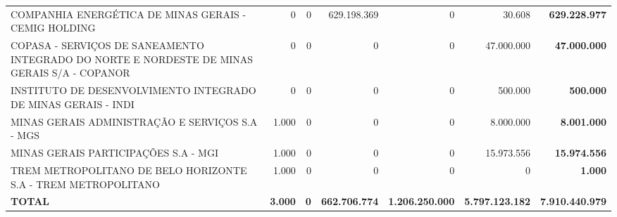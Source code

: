 \documentclass{article}
\begin{document}
\begin{longtable}[c]{m{5cm}|m{2cm}|m{2cm}|m{2cm}|m{2cm}|m{2cm}|m{2cm}}
\multicolumn{1}{L{5cm}|}{COMPANHIA ENERGÉTICA DE MINAS GERAIS - CEMIG HOLDING} & \multicolumn{1}{r|}{    0} & \multicolumn{1}{r|}{0} & \multicolumn{1}{r|}{629.198.369} & \multicolumn{1}{r|}{            0} & \multicolumn{1}{r|}{30.608} & \multicolumn{1}{r}{ \textbf{629.228.977}} \\
\multicolumn{1}{L{5cm}|}{COPASA - SERVIÇOS DE SANEAMENTO INTEGRADO DO NORTE E NORDESTE DE MINAS GERAIS S/A - COPANOR} & \multicolumn{1}{r|}{    0} & \multicolumn{1}{r|}{0} & \multicolumn{1}{r|}{          0} & \multicolumn{1}{r|}{            0} & \multicolumn{1}{r|}{47.000.000} & \multicolumn{1}{r}{ \textbf{47.000.000}} \\
\multicolumn{1}{L{5cm}|}{INSTITUTO DE DESENVOLVIMENTO INTEGRADO DE MINAS GERAIS - INDI} & \multicolumn{1}{r|}{    0} & \multicolumn{1}{r|}{0} & \multicolumn{1}{r|}{          0} & \multicolumn{1}{r|}{            0} & \multicolumn{1}{r|}{500.000} & \multicolumn{1}{r}{ \textbf{500.000}} \\
\multicolumn{1}{L{5cm}|}{MINAS GERAIS ADMINISTRAÇÃO E SERVIÇOS S.A - MGS} & \multicolumn{1}{r|}{1.000} & \multicolumn{1}{r|}{0} & \multicolumn{1}{r|}{          0} & \multicolumn{1}{r|}{            0} & \multicolumn{1}{r|}{8.000.000} & \multicolumn{1}{r}{ \textbf{8.001.000}} \\
\multicolumn{1}{L{5cm}|}{MINAS GERAIS PARTICIPAÇÕES S.A - MGI} & \multicolumn{1}{r|}{1.000} & \multicolumn{1}{r|}{0} & \multicolumn{1}{r|}{          0} & \multicolumn{1}{r|}{            0} & \multicolumn{1}{r|}{15.973.556} & \multicolumn{1}{r}{ \textbf{15.974.556}} \\
\multicolumn{1}{L{5cm}|}{TREM METROPOLITANO DE BELO HORIZONTE S.A - TREM METROPOLITANO} & \multicolumn{1}{r|}{1.000} & \multicolumn{1}{r|}{0} & \multicolumn{1}{r|}{          0} & \multicolumn{1}{r|}{            0} & \multicolumn{1}{r|}{            0} & \multicolumn{1}{r}{ \textbf{1.000}} \\
\hline \hline
\multicolumn{1}{L{5cm}|}{ \textbf{TOTAL}} & \multicolumn{1}{r|}{ \textbf{3.000}} & \multicolumn{1}{r|}{ \textbf{0}} & \multicolumn{1}{r|}{ \textbf{662.706.774}} & \multicolumn{1}{r|}{ \textbf{1.206.250.000}} & \multicolumn{1}{r|}{ \textbf{5.797.123.182}} & \multicolumn{1}{r}{ \textbf{7.910.440.979}} \\\end{longtable}
\end{document}
